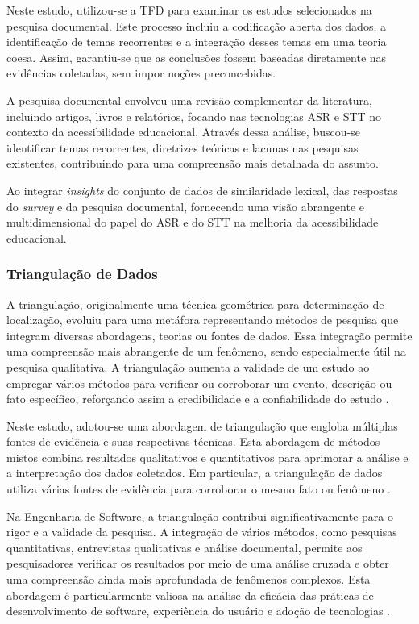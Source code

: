Neste estudo, utilizou-se a TFD para examinar os estudos selecionados na pesquisa documental. Este processo incluiu a codificação aberta dos dados, a identificação de temas recorrentes e a integração desses temas em uma teoria coesa. Assim, garantiu-se que as conclusões fossem baseadas diretamente nas evidências coletadas, sem impor noções preconcebidas.

A pesquisa documental envolveu uma revisão complementar da literatura, incluindo artigos, livros e relatórios, focando nas tecnologias ASR e STT no contexto da acessibilidade educacional. Através dessa análise, buscou-se identificar temas recorrentes, diretrizes teóricas e lacunas nas pesquisas existentes, contribuindo para uma compreensão mais detalhada do assunto.

Ao integrar \textit{insights} do conjunto de dados de similaridade lexical, das respostas do \textit{survey} e da pesquisa documental, fornecendo uma visão abrangente e multidimensional do papel do ASR e do STT na melhoria da acessibilidade educacional.

\subsubsection{Triangulação de Dados}

A triangulação, originalmente uma técnica geométrica para determinação de localização, evoluiu para uma metáfora representando métodos de pesquisa que integram diversas abordagens, teorias ou fontes de dados. Essa integração permite uma compreensão mais abrangente de um fenômeno, sendo especialmente útil na pesquisa qualitativa. A triangulação aumenta a validade de um estudo ao empregar vários métodos para verificar ou corroborar um evento, descrição ou fato específico, reforçando assim a credibilidade e a confiabilidade do estudo \cite{Farquhar2020, Yin2015}.

Neste estudo, adotou-se uma abordagem de triangulação que engloba múltiplas fontes de evidência e suas respectivas técnicas. Esta abordagem de métodos mistos combina resultados qualitativos e quantitativos para aprimorar a análise e a interpretação dos dados coletados. Em particular, a triangulação de dados utiliza várias fontes de evidência para corroborar o mesmo fato ou fenômeno \cite{Yin2015}.

Na Engenharia de Software, a triangulação contribui significativamente para o rigor e a validade da pesquisa. A integração de vários métodos, como pesquisas quantitativas, entrevistas qualitativas e análise documental, permite aos pesquisadores verificar os resultados por meio de uma análise cruzada e obter uma compreensão ainda mais aprofundada de fenômenos complexos. Esta abordagem é particularmente valiosa na análise da eficácia das práticas de desenvolvimento de software, experiência do usuário e adoção de tecnologias \cite{Runeson2009}.

